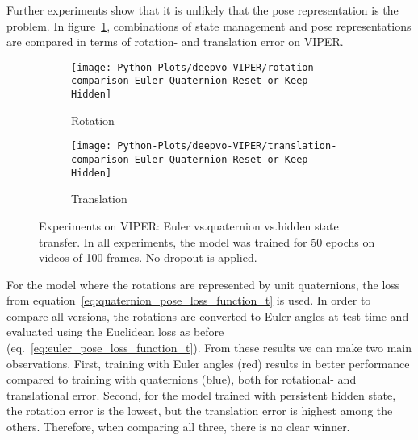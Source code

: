 		Further experiments show that it is unlikely that the pose representation is the problem.
		In figure~\ref{fig:viper-euler-vs-quat-vs-hidden-state-keep-or-reset}, combinations of state management and pose representations are compared in terms of rotation- and translation error on VIPER.
		\begin{figure}
			\centering
			\begin{subfigure}[b]{0.5\linewidth}
				\centering
				\texttt{[image: Python-Plots/deepvo-VIPER/rotation-comparison-Euler-Quaternion-Reset-or-Keep-Hidden]}
				\caption{Rotation}
			\end{subfigure}%
			\begin{subfigure}[b]{0.5\linewidth}
				\centering
				\texttt{[image: Python-Plots/deepvo-VIPER/translation-comparison-Euler-Quaternion-Reset-or-Keep-Hidden]}
				\caption{Translation}
			\end{subfigure}%
			\caption[Experiments on VIPER: Euler vs.\@ quaternion vs.\@ hidden state transfer]
					{Experiments on VIPER: Euler vs.\@ quaternion vs.\@ hidden state transfer.
					 In all experiments, the model was trained for 50 epochs on videos of 100 frames.
					 No dropout is applied.
					 \label{fig:viper-euler-vs-quat-vs-hidden-state-keep-or-reset}}
		\end{figure}
		For the model where the rotations are represented by unit quaternions, the loss from equation~\ref{eq:quaternion_pose_loss_function_t} is used.
		In order to compare all versions, the rotations are converted to Euler angles at test time and evaluated using the Euclidean loss as before (eq.\@~\ref{eq:euler_pose_loss_function_t}).
		From these results we can make two main observations.
		First, training with Euler angles (red) results in better performance compared to training with quaternions (blue), both for rotational- and translational error.
		Second, for the model trained with persistent hidden state, the rotation error is the lowest, but the translation error is highest among the others.
		Therefore, when comparing all three, there is no clear winner.
		
